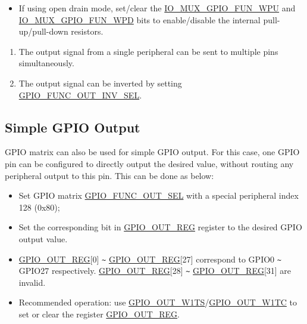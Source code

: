 \documentclass[main\_\_EN.tex]{subfiles}
\begin{document}
\begin{enumerate}
\begin{itemize}
        \item If using open drain mode, set/clear the \hyperref[fielddesc:IOMUXGPIONFUNWPU]{IO\_MUX\_GPIO\_FUN\_WPU} and \hyperref[fielddesc:IOMUXGPIONFUNWPD]{IO\_MUX\_GPIO\_FUN\_WPD} bits to enable/disable the internal pull-up/pull-down resistors.
    \end{itemize}
\end{enumerate}

\begin{tiplisting}
\vspace{-2em}
\begin{enumerate}
\item \label{output-note-1} The output signal from a single peripheral can be sent to multiple pins simultaneously.
\item \label{output-note-2} The output signal can be inverted by setting \hyperref[fielddesc:GPIOFUNCNOUTINVSEL]{GPIO\_FUNC\_OUT\_INV\_SEL}.
\end{enumerate}
\end{tiplisting}

\subsection{Simple GPIO Output}

GPIO matrix can also be used for simple GPIO output. For this case, one GPIO pin can be configured to directly output the desired value, without routing any peripheral output to this pin. This can be done as below:

\begin{itemize}
    \item Set GPIO matrix \hyperref[fielddesc:GPIOFUNCNOUTSEL]{GPIO\_FUNC\_OUT\_SEL} with a special peripheral index 128 (0x80);
    \item Set the corresponding bit in \hyperref[regdesc:GPIOOUTREG]{GPIO\_OUT\_REG} register to the desired GPIO output value.
\end{itemize}

\begin{tiplisting}
\vspace{-2em}
\begin{itemize}
\item \hyperref[regdesc:GPIOOUTREG]{GPIO\_OUT\_REG}[0] \verb+~+ \hyperref[regdesc:GPIOOUTREG]{GPIO\_OUT\_REG}[27] correspond to GPIO0 \verb+~+ GPIO27 respectively.  \hyperref[regdesc:GPIOOUTREG]{GPIO\_OUT\_REG}[28] \verb+~+ \hyperref[regdesc:GPIOOUTREG]{GPIO\_OUT\_REG}[31] are invalid.
\item Recommended operation: use \hyperref[fielddesc:GPIOOUTW1TS]{GPIO\_OUT\_W1TS}/\hyperref[fielddesc:GPIOOUTW1TC]{GPIO\_OUT\_W1TC} to set or clear the register \hyperref[regdesc:GPIOOUTREG]{GPIO\_OUT\_REG}.
\end{itemize}
\end{tiplisting}
\end{document}
